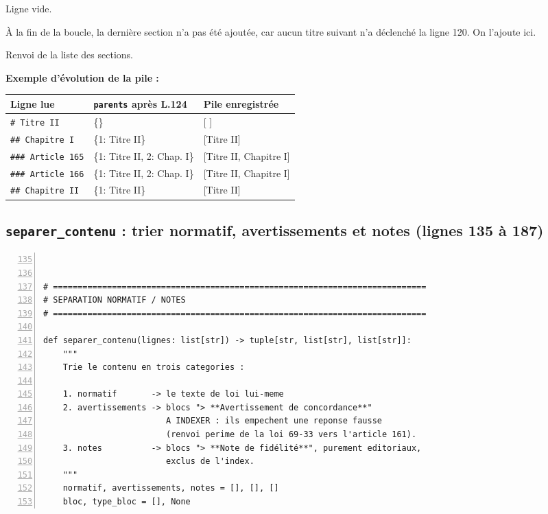 \documentclass[11pt,a4paper]{article}
\newcommand{\ligne}[1]{\item[\textcolor{num}{L.\,#1}]}
\newenvironment{explication}
  {\begin{description}\setlength{\itemsep}{3pt}\setlength{\parskip}{2pt}}
  {\end{description}}
\begin{document}
\begin{explication}
\ligne{131} Ligne vide.
\ligne{132--133} À la fin de la boucle, la dernière section n'a pas été ajoutée, car aucun titre
suivant n'a déclenché la ligne 120. On l'ajoute ici.
\ligne{134} Renvoi de la liste des sections.
\end{explication}

\textbf{Exemple d'évolution de la pile :}

\begin{longtable}{l l l}
\toprule
\textbf{Ligne lue} & \textbf{\texttt{parents} après L.124} & \textbf{Pile enregistrée} \\
\midrule
\texttt{\# Titre II}          & \{\}                     & [ ] \\
\texttt{\#\# Chapitre I}      & \{1: Titre II\}          & [Titre II] \\
\texttt{\#\#\# Article 165}   & \{1: Titre II, 2: Chap. I\} & [Titre II, Chapitre I] \\
\texttt{\#\#\# Article 166}   & \{1: Titre II, 2: Chap. I\} & [Titre II, Chapitre I] \\
\texttt{\#\# Chapitre II}     & \{1: Titre II\}          & [Titre II] \\
\bottomrule
\end{longtable}

\subsection{\texorpdfstring{\texttt{separer\_contenu}}{separer\_contenu} : trier normatif, avertissements et notes (lignes 135 à 187)}
\begin{shaded}
\begin{Verbatim}[numbers=left,firstnumber=135,numbersep=6pt,fontsize=\footnotesize,xleftmargin=1.2em]


# ============================================================================
# SEPARATION NORMATIF / NOTES
# ============================================================================

def separer_contenu(lignes: list[str]) -> tuple[str, list[str], list[str]]:
    """
    Trie le contenu en trois categories :

    1. normatif       -> le texte de loi lui-meme
    2. avertissements -> blocs "> **Avertissement de concordance**"
                         A INDEXER : ils empechent une reponse fausse
                         (renvoi perime de la loi 69-33 vers l'article 161).
    3. notes          -> blocs "> **Note de fidélité**", purement editoriaux,
                         exclus de l'index.
    """
    normatif, avertissements, notes = [], [], []
    bloc, type_bloc = [], None
\end{Verbatim}
\end{shaded}
\end{document}
